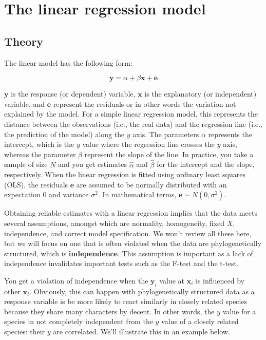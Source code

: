 \documentclass[
]{book}
\begin{document}
\chapter{The linear regression model}\label{linear-regression}

\section{Theory}\label{theory}

The linear model has the following form:

\[\textbf{y} = \alpha + \beta \textbf{x} + \textbf{e}\]

\(\textbf{y}\) is the response (or dependent) variable, \(\textbf{x}\) is the explanatory (or independent) variable, and \(\textbf{e}\) represent the residuals or in other words the variation not explained by the model. For a simple linear regression model, this represents the distance between the observations (i.e., the real data) and the regression line (i.e., the prediction of the model) along the \(y\) axis. The parameters \(\alpha\) represents the intercept, which is the \(y\) value where the regression line crosses the \(y\) axis, whereas the parameter \(\beta\) represent the slope of the line. In practice, you take a sample of size \(N\) and you get estimates \(\hat{\alpha}\) and \(\hat{\beta}\) for the intercept and the slope, respectively. When the linear regression is fitted using ordinary least squares (OLS), the residuals \(\textbf{e}\) are assumed to be normally distributed with an expectation \(0\) and variance \(\sigma^2\). In mathematical terms, \(\textbf{e} \sim N(0,\sigma^2)\).

Obtaining reliable estimates with a linear regression implies that the data meets several assumptions, amongst which are normality, homogeneity, fixed \(X\), independence, and correct model specification. We won't review all these here, but we will focus on one that is often violated when the data are phylogenetically structured, which is \textbf{independence}. This assumption is important as a lack of independence invalidates important tests such as the F-test and the t-test.

You get a violation of independence when the \(\textbf{y}_i\) value at \(\textbf{x}_i\) is influenced by other \(\textbf{x}_i\). Obviously, this can happen with phylogenetically structured data as a response variable is be more likely to react similarly in closely related species because they share many characters by decent. In other words, the \(y\) value for a species in not completely independent from the \(y\) value of a closely related species: their \(y\) are correlated. We'll illustrate this in an example below.
\end{document}
